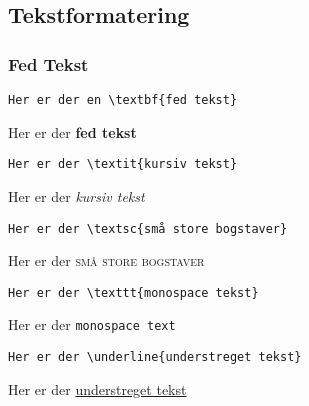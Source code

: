 \subsection{Tekstformatering}

\subsubsection{Fed Tekst}

\begin{verbatim}
Her er der en \textbf{fed tekst}
\end{verbatim}

Her er der \textbf{fed tekst} 


\begin{verbatim}
Her er der \textit{kursiv tekst}
\end{verbatim}

Her er der \textit{kursiv tekst} 


\begin{verbatim}
Her er der \textsc{små store bogstaver}
\end{verbatim}

Her er der \textsc{små store bogstaver} 


\begin{verbatim}
Her er der \texttt{monospace tekst}
\end{verbatim}

Her er der \texttt{monospace text} 


\begin{verbatim}
Her er der \underline{understreget tekst}
\end{verbatim}

Her er der \underline{understreget tekst}
